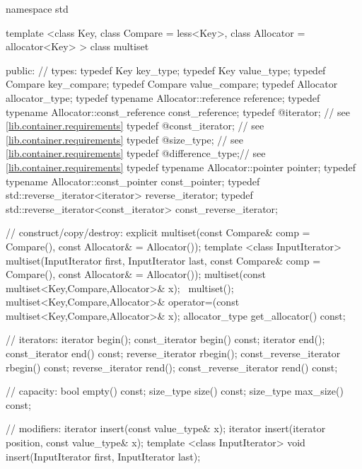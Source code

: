 \begin{codeblock}
namespace std {
  template <class Key, class Compare = less<Key>,
            class Allocator = allocator<Key> >
  class multiset {
  public:
    // types:
    typedef Key                                   key_type;
    typedef Key                                   value_type;
    typedef Compare                               key_compare;
    typedef Compare                               value_compare;
    typedef Allocator                             allocator_type;
    typedef typename Allocator::reference         reference;
    typedef typename Allocator::const_reference   const_reference;
    typedef @\impdef@                iterator;       // see \ref{lib.container.requirements}
    typedef @\impdef@                const_iterator; // see \ref{lib.container.requirements}
    typedef @\impdef@                size_type;      // see \ref{lib.container.requirements}
    typedef @\impdef@                difference_type;// see \ref{lib.container.requirements}
    typedef typename Allocator::pointer           pointer;
    typedef typename Allocator::const_pointer     const_pointer;
    typedef std::reverse_iterator<iterator>       reverse_iterator;
    typedef std::reverse_iterator<const_iterator> const_reverse_iterator;

    // construct/copy/destroy:
    explicit multiset(const Compare& comp = Compare(),
                      const Allocator& = Allocator());
    template <class InputIterator>
      multiset(InputIterator first, InputIterator last,
               const Compare& comp = Compare(),
               const Allocator& = Allocator());
    multiset(const multiset<Key,Compare,Allocator>& x);
   ~multiset();
    multiset<Key,Compare,Allocator>&
        operator=(const multiset<Key,Compare,Allocator>& x);
    allocator_type get_allocator() const;

    // iterators:
    iterator               begin();
    const_iterator         begin() const;
    iterator               end();
    const_iterator         end() const;
    reverse_iterator       rbegin();
    const_reverse_iterator rbegin() const;
    reverse_iterator       rend();
    const_reverse_iterator rend() const;

    // capacity:
    bool          empty() const;
    size_type     size() const;
    size_type     max_size() const;

    // modifiers:
    iterator insert(const value_type& x);
    iterator insert(iterator position, const value_type& x);
    template <class InputIterator>
      void insert(InputIterator first, InputIterator last);

}}
\end{codeblock}
